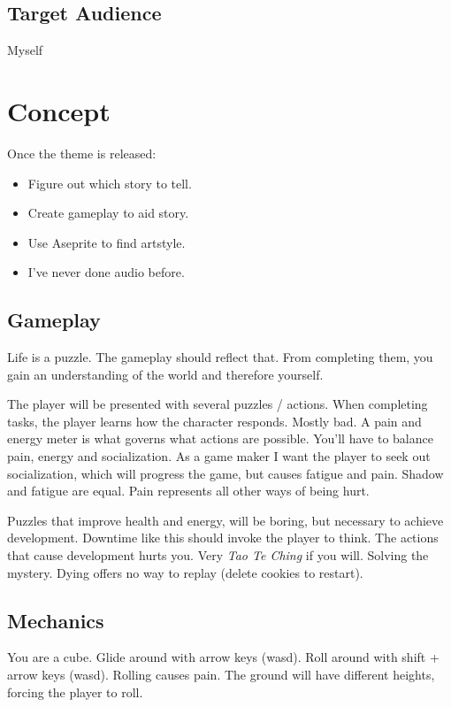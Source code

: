 \documentclass[12pt, letterpaper]{article}
\begin{document}
\subsection{Target Audience}

Myself

\section{Concept}

Once the theme is released:
\begin{itemize}[itemsep=1pt]
    \item Figure out which story to tell.
    \item Create gameplay to aid story.
    \item Use Aseprite to find artstyle.
    \item I've never done audio before.
\end{itemize}

\subsection{Gameplay}

Life is a puzzle. The gameplay should reflect that.
From completing them, you gain an understanding of the world and
therefore yourself.

The player will be presented with several puzzles / actions. When completing
tasks, the player learns how the character responds. Mostly bad. A pain and
energy meter is what governs what actions are possible. You'll have to balance
pain, energy and socialization. As a game maker I want the player to seek out
socialization, which will progress the game, but causes fatigue and pain.
Shadow and fatigue are equal. Pain represents all other ways of being hurt.

Puzzles that improve health and energy, will be boring, but necessary to
achieve development. Downtime like this should invoke the player to think. The
actions that cause development hurts you. Very \textit{Tao Te Ching} if you
will. Solving the mystery. Dying offers no way to replay (delete cookies to
restart).

\subsection{Mechanics}

You are a cube. Glide around with arrow keys (wasd). Roll around with shift +
arrow keys (wasd). Rolling causes pain. The ground will have different heights,
forcing the player to roll. 
\end{document}
